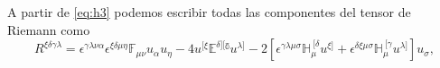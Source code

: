 A partir de \eqref{eq:h3} podemos escribir todas las componentes del tensor de Riemann como
\begin{equation}
R^{\xi \delta \gamma \lambda} = \epsilon^{\gamma \lambda \nu \alpha} \epsilon^{\xi \delta \mu \eta} \mathbb{F}_{\mu \nu} u_{\alpha} u_{\eta} - 4 u^{[ \xi} \mathbb{E^{\delta] [\gamma}} u^{\lambda]} 
 - 2\left[ \epsilon^{\gamma \lambda \mu \sigma} \mathbb{H}_{\mu}^{\ [ \delta} u^{\xi ]} + \epsilon^{\delta \xi \mu \sigma} \mathbb{H}_{\mu}^{\ [ \gamma} u^{\lambda ]} \right] u_{\sigma},
\end{equation}